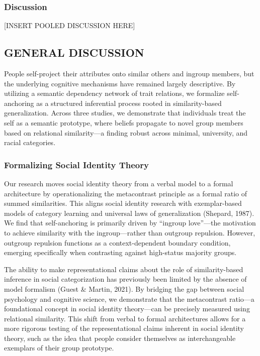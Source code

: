 \documentclass[
  man,
  longtable,
  nolmodern,
  notxfonts,
  notimes,
  man]{apa7}
\begin{document}
\subsubsection{Discussion}\label{discussion-3}

{[}INSERT POOLED DISCUSSION HERE{]}

\subsection{GENERAL DISCUSSION}\label{general-discussion}

People self-project their attributes onto similar others and ingroup
members, but the underlying cognitive mechanisms have remained largely
descriptive. By utilizing a semantic dependency network of trait
relations, we formalize self-anchoring as a structured inferential
process rooted in similarity-based generalization. Across three studies,
we demonstrate that individuals treat the self as a semantic prototype,
where beliefs propagate to novel group members based on relational
similarity---a finding robust across minimal, university, and racial
categories.

\subsubsection{Formalizing Social Identity
Theory}\label{formalizing-social-identity-theory}

Our research moves social identity theory from a verbal model to a
formal architecture by operationalizing the metacontrast principle as a
formal ratio of summed similarities. This aligns social identity
research with exemplar-based models of category learning and universal
laws of generalization (Shepard, 1987). We find that self-anchoring is
primarily driven by ``ingroup love''---the motivation to achieve
similarity with the ingroup---rather than outgroup repulsion. However,
outgroup repulsion functions as a context-dependent boundary condition,
emerging specifically when contrasting against high-status majority
groups.

The ability to make representational claims about the role of
similarity-based inference in social categorization has previously been
limited by the absence of model formalism (Guest \& Martin, 2021). By
bridging the gap between social psychology and cognitive science, we
demonstrate that the metacontrast ratio---a foundational concept in
social identity theory---can be precisely measured using relational
similarity. This shift from verbal to formal architectures allows for a
more rigorous testing of the representational claims inherent in social
identity theory, such as the idea that people consider themselves as
interchangeable exemplars of their group prototype.
\end{document}
